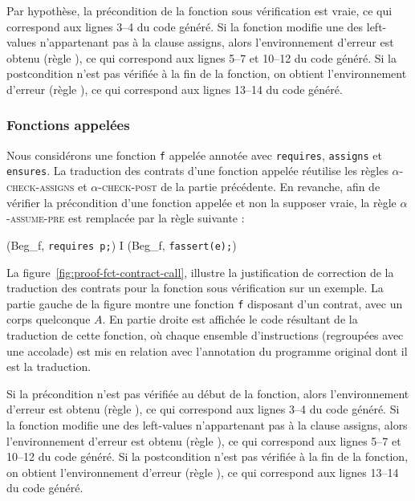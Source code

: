 Par hypothèse, la précondition de la fonction sous vérification est vraie, ce
qui correspond aux lignes 3--4 du code généré.
Si la fonction modifie une des left-values n'appartenant pas à la clause
assigns, alors l'environnement d'erreur est obtenu (règle ), ce qui
correspond aux lignes 5--7 et 10--12 du code généré.
Si la postcondition n'est pas vérifiée à la fin de la fonction, on obtient
l'environnement d'erreur (règle ), ce qui correspond aux lignes
13--14 du code généré.


\subsubsection{Fonctions appelées}



Nous considérons une fonction \lstinline'f' appelée annotée avec
\lstinline'requires', \lstinline'assigns' et \lstinline'ensures'.
La traduction des contrats d'une fonction appelée réutilise les règles
\textsc{$\alpha$-check-assigns} et \textsc{$\alpha$-check-post} de la partie
précédente.
En revanche, afin de vérifier la précondition d'une fonction appelée et non la
supposer vraie, la règle \textsc{$\alpha$-assume-pre} est remplacée par la règle
suivante :

{\scriptsize
  {
    {(Beg_f, \mbox{\lstinline'requires p;'})
      I \concat (Beg_f, \mbox{\lstinline'fassert(e);'})}
  }
}

La figure~\ref{fig:proof-fct-contract-call}, illustre la justification de
correction
de la traduction des contrats pour la fonction sous vérification sur un exemple.
La partie gauche de la figure montre une fonction \lstinline'f' disposant d'un
contrat, avec un corps quelconque $A$.
En partie droite est affichée le code résultant de la traduction de cette
fonction, où chaque ensemble d'instructions (regroupées avec une accolade) est
mis en relation avec l'annotation du programme original dont il est la
traduction.

Si la précondition n'est pas vérifiée au début de la fonction, alors
l'environnement d'erreur est obtenu (règle ), ce qui correspond aux
lignes 3--4 du code généré.
Si la fonction modifie une des left-values n'appartenant pas à la clause
assigns, alors l'environnement d'erreur est obtenu (règle ), ce qui
correspond aux lignes 5--7 et 10--12 du code généré.
Si la postcondition n'est pas vérifiée à la fin de la fonction, on obtient
l'environnement d'erreur (règle ), ce qui correspond aux lignes
13--14 du code généré.


